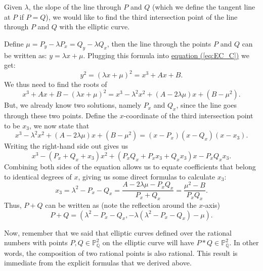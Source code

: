 \documentclass[openany, a4paper, 10pt]{book}
\theoremstyle{plain}
\theoremstyle{plain}
\theoremstyle{plain}
\theoremstyle{definition}
\theoremstyle{plain}
\theoremstyle{definition}
\theoremstyle{remark}
\renewcommand{\eqref}[1]{\hyperref[#1]{equation (\ref{#1})}}
\begin{document}
Given $\lambda$, the slope of the line through $P$ and $Q$ (which we define the tangent line at $P$ if $P=Q$), we would like to find the third intersection point of the line through $P$ and $Q$ with the elliptic curve.

Define $\mu = P_y - \lambda P_x = Q_y - \lambda Q_x$, then the line through the points $P$ and $Q$ can be written as:
$y = \lambda x + \mu$.
Plugging this formula into \eqref{eq:EC_C} we get:
\begin{equation*}
    y^2 = (\lambda x + \mu)^2 = x^3 + Ax + B.
\end{equation*}
We thus need to find the roots of
\begin{equation*}
    x^3 + Ax + B - (\lambda x + \mu)^2 =
    x^3 - \lambda^2 x^2 + (A - 2\lambda\mu) x + (B - \mu^2)
    .
\end{equation*}
But, we already know two solutions, namely $P_x$ and $Q_x$, since the line goes through these two points.
Define the $x$-coordinate of the third intersection point to be
$x_3$, we now state that
\begin{equation*}
    x^3 - \lambda^2 x^2 + (A - 2\lambda\mu) x + (B - \mu^2) =
    (x-P_x)(x-Q_x)(x-x_3).
\end{equation*}
Writing the right-hand side out gives us
\begin{equation*}
    x^3 - (P_x + Q_x + x_3) x^2 + (P_xQ_x + P_xx_3 + Q_xx_3)x - P_xQ_xx_3.
\end{equation*}
Combining both sides of the equation allows us to equate coefficients that belong to identical degrees of $x$, giving us some direct formulas to calculate $x_3$:
\begin{equation}\label{eq:xcoor_addition}
    x_3 = \lambda^2-P_x-Q_x = \frac{A-2\lambda\mu - P_xQ_x}{P_x + Q_x} = \frac{\mu^2-B}{P_xQ_x}.
\end{equation}
Thus, $P+Q$ can be written as (note the reflection around the $x$-axis)
\begin{equation*}
    P+Q = (\lambda^2-P_x-Q_x, -\lambda(\lambda^2-P_x-Q_x) - \mu).
\end{equation*}

Now, remember that we said that elliptic curves defined over the rational numbers with points $P,Q \in \mathbb P_{\mathbb Q}^2$ on the elliptic curve will have $P*Q \in \mathbb P_{\mathbb Q}^2$.
In other words, the composition of two rational points is also rational.
This result is immediate from the explicit formulas that we derived above.
\end{document}
